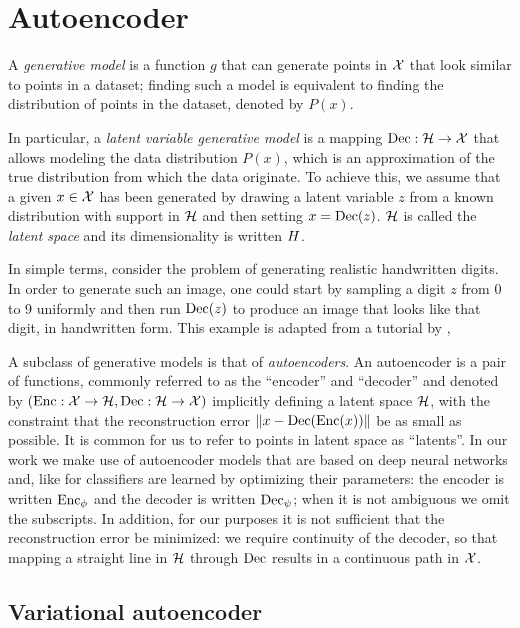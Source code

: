 \documentclass[../main.tex]{subfiles}
\begin{document}
\section{Autoencoder}

A \emph{generative model} is a function $g$ that can generate points in $\mathcal{X}$ that look similar to points in a dataset; finding such a model is equivalent to finding the distribution of points in the dataset, denoted by $P(x)$.

In particular, a \emph{latent variable generative model} is a mapping $\operatorname{Dec}: \mathcal{H} \to \mathcal{X}$ that allows modeling the data distribution $P(x)$, which is an approximation
of the true distribution from which the data originate.
To achieve this, we assume that a given $x \in \mathcal{X}$ has been generated by drawing a latent variable $z$ from a known distribution with support in $\mathcal{H}$ and then setting $x = \operatorname{Dec}(z)$.
$\mathcal{H}$ is called the \emph{latent space} and its dimensionality is written $H$.

In simple terms, consider the problem of generating realistic handwritten digits.
In order to generate such an image, one could start by sampling a digit $z$ from 0 to 9 uniformly and then
run $\operatorname{Dec}(z)$ to produce an image that looks like that digit, in handwritten form.
This example is adapted from a tutorial by \citeauthor{doerschTutorial2021} \cite{doerschTutorial2021},

A subclass of generative models is that of \emph{autoencoders}.
An autoencoder is a pair of functions, commonly referred to as the ``encoder'' and ``decoder'' and denoted by $(\operatorname{Enc}: \mathcal{X} \to \mathcal{H}, \operatorname{Dec}: \mathcal{H} \to \mathcal{X})$ implicitly defining a latent space $\mathcal{H}$, with the constraint that the reconstruction error $\left\lVert x - \operatorname{Dec}(\operatorname{Enc}(x))\right\rVert$ be as small as possible.
It is common for us to refer to points in latent space as ``latents''.
In our work we make use of autoencoder models that are based on deep neural networks and, like for classifiers
are learned by optimizing their parameters:
the encoder is written $\operatorname{Enc}_\phi$ and the decoder is written $\operatorname{Dec}_\psi$; when it is not ambiguous we omit the subscripts.
In addition, for our purposes it is not sufficient that the reconstruction error be minimized: we require continuity of the decoder, so that mapping a straight line in $\mathcal{H}$ through $\operatorname{Dec}$ results in a continuous path in $\mathcal{X}$.

\subsection{Variational autoencoder}
\end{document}
